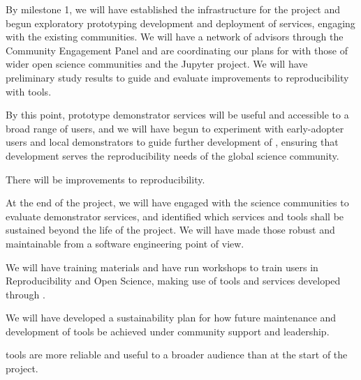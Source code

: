 \begin{milestones}
  {

  By milestone 1, we will have established the infrastructure for the project
  and begun exploratory prototyping development and deployment of services,
  engaging with the existing communities. We will have a network of advisors
  through the Community Engagement Panel and are coordinating our plans for
  \TheProject with those of wider open science communities and the Jupyter
  project. We will have preliminary study results to guide and evaluate
  improvements to reproducibility with \TheProject tools. }

  {

  By this point, prototype demonstrator services will be useful and accessible
  to a broad range of users, and we will have begun to experiment with early-adopter
  users and local demonstrators to guide further development of \TheProject,
  ensuring that development serves the reproducibility needs of the global science community.

  There will be improvements to reproducibility.
  }

  {
  At the end of the project,
  we will have engaged with the science communities to evaluate demonstrator services, and
  identified which services and tools shall be sustained beyond the life of the project.
  We will have made those robust and maintainable from a software engineering point of view.

  We will have training materials and have run workshops to train users in Reproducibility and Open Science,
  making use of tools and services developed through \TheProject.

  We will have developed a sustainability plan for how future maintenance and
  development of \TheProject tools be achieved under community support and
  leadership.

  \TheProject tools are more reliable and useful to a broader audience than at
  the start of the project.

  }


\end{milestones}
